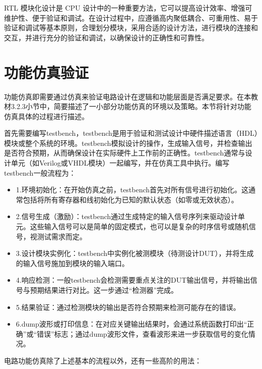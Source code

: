 RTL 模块化设计是 CPU
设计中的一种重要方法，它可以提高设计效率、增强可维护性、便于验证和调试。在设计过程中，应遵循高内聚低耦合、可重用性、易于验证和调试等基本原则，合理划分模块，采用合适的设计方法，进行模块的连接和交互，并进行充分的验证和调试，以确保设计的正确性和可靠性。

\section{功能仿真验证}\label{sec:16-chip-frontend-017}

功能仿真即需要通过仿真来验证电路设计在逻辑和功能层面是否满足要求。在本教材3.2.3小节中，简要描述了一小部分功能仿真的环境以及策略。本节将针对功能仿真具体的过程进行描述。

首先需要编写testbench，testbench是用于验证和测试设计中硬件描述语言（HDL）模块或整个系统的环境。testbench模拟设计的操作，生成输入信号，并检查输出是否符合预期，从而确保设计在实际硬件上工作前的正确性。testbench通常与设计单元（如Verilog或VHDL模块）一起编写，并在仿真工具中执行。编写testbench一般流程为：

\begin{itemize}
\item
  1.环境初始化：在开始仿真之前，testbench首先对所有信号进行初始化。这通常包括将所有寄存器和线初始化为已知的默认状态（如零或无效状态）。
\item
  2.信号生成（激励）：testbench通过生成特定的输入信号序列来驱动设计单元。这些输入信号可以是简单的固定模式，也可以是复杂的时序信号或随机信号，视测试需求而定。
\item
  3.设计模块实例化：testbench中实例化被测模块（待测设计DUT），并将生成的输入信号施加到模块的输入端口。
\item
  4.响应检测：一般testbench会检测需要重点关注的DUT输出信号，并将输出信号与预期结果进行对比。这一步通过``检测器''完成。
\item
  5.结果验证：通过检测模块的输出是否符合预期来检测可能存在的错误。
\item
  6.dump波形或打印信息：在对应关键输出结果时，会通过系统函数打印出``正确''或``错误''标志；通过dump波形文件，查看波形来进一步获取信号的变化情况。
\end{itemize}

电路功能仿真除了上述基本的流程以外，还有一些高阶的用法：

